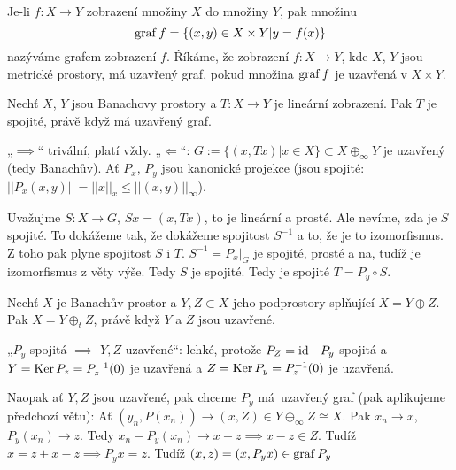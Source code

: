 \documentclass[12pt]{article}					%
\begin{document}
\begin{definice}[Graf]
	Je-li $f: X \rightarrow Y$ zobrazení množiny $X$ do množiny $Y$, pak množinu
	$$ \operatorname{graf} f = \{(x, y) \in X \times Y | y = f(x)\} $$
	nazýváme grafem zobrazení $f$. Říkáme, že zobrazení $f: X \rightarrow Y$, kde $X$, $Y$ jsou metrické prostory, má uzavřený graf, pokud množina $\operatorname{graf} f$ je uzavřená v $X \times Y$.
\end{definice}

\begin{veta}
	Nechť $X$, $Y$ jsou Banachovy prostory a $T: X \rightarrow Y$ je lineární zobrazení. Pak $T$ je spojité, právě když má uzavřený graf.

	\begin{dukazin}
		„$\implies$“ trivální, platí vždy. „$\Leftarrow$“: $G:= \{(x, Tx) | x \in X\} \subset X \oplus_∞ Y$ je uzavřený (tedy Banachův). Ať $P_x$, $P_y$ jsou kanonické projekce (jsou spojité: $||P_x(x, y)|| = ||x||_x ≤ ||(x, y)||_∞$).

		Uvažujme $S: X \rightarrow G$, $Sx = (x, Tx)$, to je lineární a prosté. Ale nevíme, zda je $S$ spojité. To dokážeme tak, že dokážeme spojitost $S^{-1}$ a to, že je to izomorfismus. Z toho pak plyne spojitost $S$ i $T$. $S^{-1} = P_x|_G$ je spojité, prosté a na, tudíž je izomorfismus z věty výše. Tedy $S$ je spojité. Tedy je spojité $T = P_y \circ S$.
	\end{dukazin}
\end{veta}

\begin{veta}
	Nechť $X$ je Banachův prostor a $Y, Z \subset X$ jeho podprostory splňující $X = Y \oplus Z$. Pak $X = Y\oplus_t Z$, právě když $Y$ a $Z$ jsou uzavřené.

	\begin{dukazin}
		„$P_y$ spojitá $\implies$ $Y, Z$ uzavřené“: lehké, protože $P_Z = \operatorname{id} - P_y$ spojitá a $Y = \operatorname{Ker} P_z = P_z^{-1}(0)$ je uzavřená a $Z = \operatorname{Ker} P_y = P_z^{-1}(0)$ je uzavřená.

		Naopak ať $Y, Z$ jsou uzavřené, pak chceme $P_y$ má uzavřený graf (pak aplikujeme předchozí větu): Ať $(y_n, P(x_n)) \rightarrow (x, Z) \in Y \oplus_∞ Z \cong X$. Pak $x_n \rightarrow x$, $P_y(x_n) \rightarrow z$. Tedy $x_n - P_y(x_n) \rightarrow x - z \implies x - z \in Z$. Tudíž $x = z + x - z \implies P_y x = z$. Tudíž $(x, z) = (x, P_yx) \in \operatorname{graf} P_y$
	\end{dukazin}
\end{veta}
\end{document}
